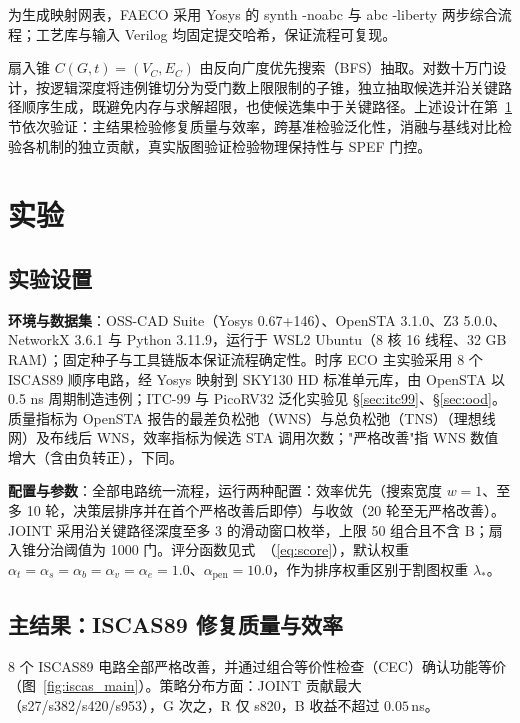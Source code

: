 \documentclass[twocolumn,10pt]{ctexart}
\renewcommand{\eqref}[1]{\textup{（\ref{#1}）}}
\begin{document}
为生成映射网表，FAECO 采用 Yosys 的 synth -noabc 与 abc -liberty 两步综合流程；工艺库与输入 Verilog 均固定提交哈希，保证流程可复现。

扇入锥 $C(G, t) = (V_C, E_C)$ 由反向广度优先搜索（BFS）抽取。对数十万门设计，按逻辑深度将违例锥切分为受门数上限限制的子锥，独立抽取候选并沿关键路径顺序生成，既避免内存与求解超限，也使候选集中于关键路径。上述设计在第~\ref{sec:exp} 节依次验证：主结果检验修复质量与效率，跨基准检验泛化性，消融与基线对比检验各机制的独立贡献，真实版图验证检验物理保持性与 SPEF 门控。

\section{实验}\label{sec:exp}

\subsection{实验设置}\label{sec:setup}

\textbf{环境与数据集}：OSS-CAD Suite（Yosys 0.67+146）、OpenSTA 3.1.0\cite{opensta}、Z3 5.0.0\cite{z3}、NetworkX 3.6.1\cite{networkx} 与 Python 3.11.9，运行于 WSL2 Ubuntu（8 核 16 线程、32 GB RAM）；固定种子与工具链版本保证流程确定性。时序 ECO 主实验采用 8 个 ISCAS89 顺序电路，经 Yosys 映射到 SKY130 HD 标准单元库，由 OpenSTA 以 0.5 ns 周期制造违例；ITC-99 与 PicoRV32 泛化实验见 \S\ref{sec:itc99}、\S\ref{sec:ood}。质量指标为 OpenSTA 报告的最差负松弛（WNS）与总负松弛（TNS）（理想线网）及布线后 WNS，效率指标为候选 STA 调用次数；"严格改善"指 WNS 数值增大（含由负转正），下同。

\textbf{配置与参数}：全部电路统一流程，运行两种配置：效率优先（搜索宽度 $w=1$、至多 10 轮，决策层排序并在首个严格改善后即停）与收敛（20 轮至无严格改善）。JOINT 采用沿关键路径深度至多 3 的滑动窗口枚举，上限 50 组合且不含 B；扇入锥分治阈值为 1000 门。评分函数见式~\eqref{eq:score}，默认权重 $\alpha_t=\alpha_s=\alpha_b=\alpha_v=\alpha_e=1.0$、$\alpha_{\mathrm{pen}}=10.0$，作为排序权重区别于割图权重 $\lambda_*$。

\subsection{主结果：ISCAS89 修复质量与效率}\label{sec:iscas}

8 个 ISCAS89 电路全部严格改善，并通过组合等价性检查（CEC）确认功能等价（图~\ref{fig:iscas_main}）。策略分布方面：JOINT 贡献最大（s27/s382/s420/s953），G 次之，R 仅 s820，B 收益不超过 $0.05\,$ns。
\end{document}
